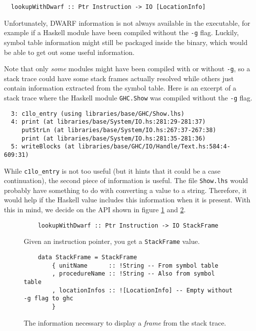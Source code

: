 \begin{verbatim}
  lookupWithDwarf :: Ptr Instruction -> IO [LocationInfo]
\end{verbatim}

Unfortunately, DWARF information is not always available in the
executable, for example if a Haskell module have been compiled without
the
\texttt{-g} flag. Luckily, symbol table information might still be
packaged inside the binary, which would be able to get out some useful
information.

Note that only \emph{some} modules might have been compiled
with or without \texttt{-g}, so a stack trace could have some stack frames actually
resolved while others just contain information extracted from the symbol
table. Here is an excerpt of a stack trace where the Haskell module \texttt{GHC.Show}
was compiled without the \texttt{-g} flag.

\begin{verbatim}
  3: c1lo_entry (using libraries/base/GHC/Show.lhs)
  4: print (at libraries/base/System/IO.hs:281:29-281:37)
     putStrLn (at libraries/base/System/IO.hs:267:37-267:38)
     print (at libraries/base/System/IO.hs:281:35-281:36)
  5: writeBlocks (at libraries/base/GHC/IO/Handle/Text.hs:584:4-609:31)
\end{verbatim}

While \texttt{c1lo\_entry} is not too useful (but it hints that it
could be a case continuation), the second piece of information is
useful. The file \texttt{Show.lhs} would probably have something to do
with converting a value to a string. Therefore, it would help if the
Haskell value includes this information when it is present. With this
in mind, we decide on the API shown in figure \ref{fig:lookup_with_dwarf}
and \ref{fig:stack_frame}.

\begin{figure}
\begin{mdframed}
  \begin{verbatim}
    lookupWithDwarf :: Ptr Instruction -> IO StackFrame
  \end{verbatim}
  \caption{Given an instruction pointer, you get a \texttt{StackFrame} value.}
  \label{fig:lookup_with_dwarf}
\end{mdframed}
\end{figure}

\begin{figure}
\begin{mdframed}
  \begin{verbatim}
    data StackFrame = StackFrame
        { unitName      :: !String -- From symbol table
        , procedureName :: !String -- Also from symbol table
        , locationInfos :: ![LocationInfo] -- Empty without -g flag to ghc
        }
  \end{verbatim}
  \caption{The information necessary to display a \emph{frame} from the stack
    trace.}
  \label{fig:stack_frame}
\end{mdframed}
\end{figure}

